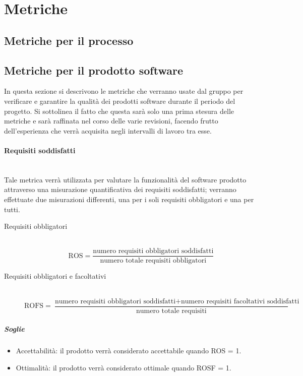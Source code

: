 \section{Metriche}
\subsection{Metriche per il processo}
\label{AppB:metricheProc}
\subsection{Metriche per il prodotto software}
\label{AppB:metricheProd}
In questa sezione si descrivono le metriche che verranno usate dal gruppo per verificare e garantire la qualità dei prodotti software durante il periodo del progetto. Si sottolinea il fatto che questa sarà solo una prima stesura delle metriche e sarà raffinata nel corso delle varie revisioni, facendo frutto dell'esperienza che verrà acquisita negli intervalli di lavoro tra esse.

\paragraph{Requisiti soddisfatti}
	~\\Tale metrica verrà utilizzata per valutare la funzionalità del software prodotto attraverso una misurazione quantificativa dei requisiti soddisfatti; verranno effettuate due misurazioni differenti, una per i soli requisiti obbligatori e una per tutti.

\begin{description}
\item[Requisiti obbligatori]
	~\\ \begin{displaymath}
		\mbox{ROS}=\frac{\mbox{numero requisiti obbligatori soddisfatti}}{\mbox{numero totale requisiti obbligatori}}
	\end{displaymath}
	
\item[Requisiti obbligatori e facoltativi]
	~\\ \begin{displaymath}
		\mbox{ROFS}=\frac{\mbox{numero requisiti obbligatori soddisfatti} + \mbox{numero requisiti facoltativi soddisfatti}}{\mbox{numero totale requisiti}}
	\end{displaymath}
\end{description}

\subparagraph{Soglie}
\begin{itemize}
\item Accettabilità: il prodotto verrà considerato accettabile quando ROS = 1.
\item Ottimalità: il prodotto verrà considerato ottimale quando ROSF = 1.
\end{itemize}

\paragraph{}
